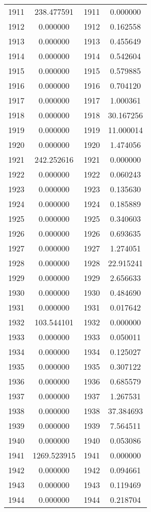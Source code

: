 \documentclass[12pt]{article}
\begin{document}
\begin{longtable}{@{}cccc@{}}
1911 & 238.477591 & 1911 & 0.000000 \\
1912 & 0.000000 & 1912 & 0.162558 \\
1913 & 0.000000 & 1913 & 0.455649 \\
1914 & 0.000000 & 1914 & 0.542604 \\
1915 & 0.000000 & 1915 & 0.579885 \\
1916 & 0.000000 & 1916 & 0.704120 \\
1917 & 0.000000 & 1917 & 1.000361 \\
1918 & 0.000000 & 1918 & 30.167256 \\
1919 & 0.000000 & 1919 & 11.000014 \\
1920 & 0.000000 & 1920 & 1.474056 \\
1921 & 242.252616 & 1921 & 0.000000 \\
1922 & 0.000000 & 1922 & 0.060243 \\
1923 & 0.000000 & 1923 & 0.135630 \\
1924 & 0.000000 & 1924 & 0.185889 \\
1925 & 0.000000 & 1925 & 0.340603 \\
1926 & 0.000000 & 1926 & 0.693635 \\
1927 & 0.000000 & 1927 & 1.274051 \\
1928 & 0.000000 & 1928 & 22.915241 \\
1929 & 0.000000 & 1929 & 2.656633 \\
1930 & 0.000000 & 1930 & 0.484690 \\
1931 & 0.000000 & 1931 & 0.017642 \\
1932 & 103.544101 & 1932 & 0.000000 \\
1933 & 0.000000 & 1933 & 0.050011 \\
1934 & 0.000000 & 1934 & 0.125027 \\
1935 & 0.000000 & 1935 & 0.307122 \\
1936 & 0.000000 & 1936 & 0.685579 \\
1937 & 0.000000 & 1937 & 1.267531 \\
1938 & 0.000000 & 1938 & 37.384693 \\
1939 & 0.000000 & 1939 & 7.564511 \\
1940 & 0.000000 & 1940 & 0.053086 \\
1941 & 1269.523915 & 1941 & 0.000000 \\
1942 & 0.000000 & 1942 & 0.094661 \\
1943 & 0.000000 & 1943 & 0.119469 \\
1944 & 0.000000 & 1944 & 0.218704 \\

\end{longtable}
\end{document}
